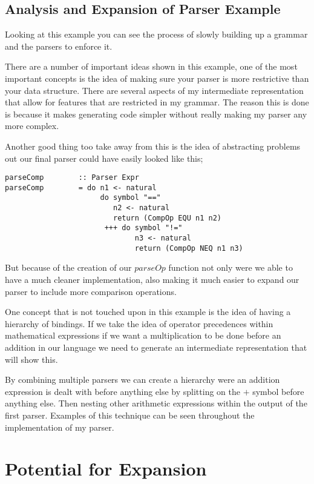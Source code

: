 \subsection{Analysis and Expansion of Parser Example}

Looking at this example you can see the process of slowly building up a grammar and the parsers to enforce it.

There are a number of important ideas shown in this example, one of the most important concepts is the idea of making sure your parser is more restrictive than your data structure. There are several aspects of my intermediate representation that allow for features that are restricted in my grammar. The reason this is done is because it makes generating code simpler without really making my parser any more complex.  

Another good thing too take away from this is the idea of abstracting problems out our final parser could have easily looked like this;

\begin{lstlisting}
parseComp        :: Parser Expr	
parseComp        = do n1 <- natural
                      do symbol "==" 
                         n2 <- natural
                         return (CompOp EQU n1 n2)
                       +++ do symbol "!="
                              n3 <- natural
                              return (CompOp NEQ n1 n3)
\end{lstlisting}

But because of the creation of our $parseOp$ function not only were we able to have a much cleaner implementation, also making it  much easier to expand our parser to include more comparison operations.

One concept that is not touched upon in this example is the idea of having a hierarchy of bindings. If we take the idea of operator precedences within mathematical expressions if we want a multiplication to be done before an addition in our language we need to generate an intermediate representation that will show this.

By combining multiple parsers we can create a hierarchy were an addition expression is dealt with before anything else by splitting on the $+$ symbol before anything else. Then nesting other arithmetic expressions within the output of the first parser. Examples of this technique can be seen throughout the implementation of my parser.


\section{Potential for Expansion}


